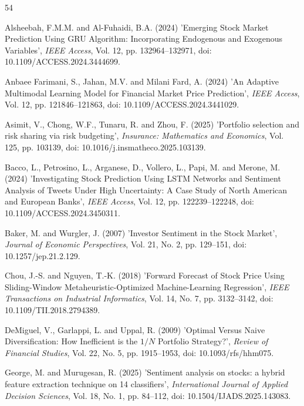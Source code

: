 \documentclass{singlecol-new}
\theoremstyle{TH}{
\newtheorem{lemma}{Lemma}
\newtheorem{theorem}[lemma]{Theorem}
\newtheorem{corrolary}[lemma]{Corrolary}
\newtheorem{conjecture}[lemma]{Conjecture}
\newtheorem{proposition}[lemma]{Proposition}
\newtheorem{claim}[lemma]{Claim}
\newtheorem{stheorem}[lemma]{Wrong Theorem}
\newtheorem{algorithm}{Algorithm}
}
\theoremstyle{THrm}{
\newtheorem{definition}{Definition}[section]
\newtheorem{question}{Question}[section]
\newtheorem{remark}{Remark}
\newtheorem{scheme}{Scheme}
}
\theoremstyle{THhit}{
\newtheorem{case}{Case}[section]
}
\begin{document}
\label{sec:refs}
\begin{thebibliography}{54}

Alsheebah, F.M.M. and Al-Fuhaidi, B.A. (2024) 'Emerging Stock Market Prediction Using GRU Algorithm: Incorporating Endogenous and Exogenous Variables', {\it IEEE Access}, Vol. 12, pp. 132964--132971, doi: 10.1109/ACCESS.2024.3444699.

Anbaee Farimani, S., Jahan, M.V. and Milani Fard, A. (2024) 'An Adaptive Multimodal Learning Model for Financial Market Price Prediction', {\it IEEE Access}, Vol. 12, pp. 121846--121863, doi: 10.1109/ACCESS.2024.3441029.

Asimit, V., Chong, W.F., Tunaru, R. and Zhou, F. (2025) 'Portfolio selection and risk sharing via risk budgeting', {\it Insurance: Mathematics and Economics}, Vol. 125, pp. 103139, doi: 10.1016/j.insmatheco.2025.103139.

Bacco, L., Petrosino, L., Arganese, D., Vollero, L., Papi, M. and Merone, M. (2024) 'Investigating Stock Prediction Using LSTM Networks and Sentiment Analysis of Tweets Under High Uncertainty: A Case Study of North American and European Banks', {\it IEEE Access}, Vol. 12, pp. 122239--122248, doi: 10.1109/ACCESS.2024.3450311.

Baker, M. and Wurgler, J. (2007) 'Investor Sentiment in the Stock Market', {\it Journal of Economic Perspectives}, Vol. 21, No. 2, pp. 129--151, doi: 10.1257/jep.21.2.129.

Chou, J.-S. and Nguyen, T.-K. (2018) 'Forward Forecast of Stock Price Using Sliding-Window Metaheuristic-Optimized Machine-Learning Regression', {\it IEEE Transactions on Industrial Informatics}, Vol. 14, No. 7, pp. 3132--3142, doi: 10.1109/TII.2018.2794389.

DeMiguel, V., Garlappi, L. and Uppal, R. (2009) 'Optimal Versus Naive Diversification: How Inefficient is the $1/N$ Portfolio Strategy?', {\it Review of Financial Studies}, Vol. 22, No. 5, pp. 1915--1953, doi: 10.1093/rfs/hhm075.

George, M. and Murugesan, R. (2025) 'Sentiment analysis on stocks: a hybrid feature extraction technique on 14 classifiers', {\it International Journal of Applied Decision Sciences}, Vol. 18, No. 1, pp. 84--112, doi: 10.1504/IJADS.2025.143083.


\end{thebibliography}
\end{document}
